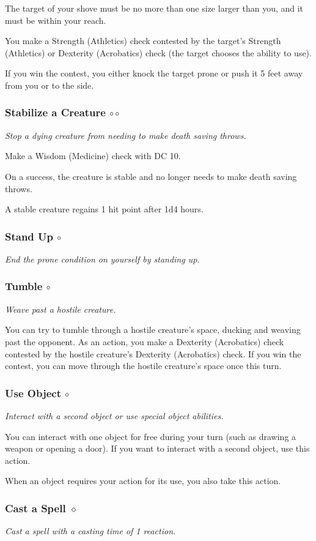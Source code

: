     The target of your shove must be no more than one size larger than you, and it must be within your reach.

    You make a Strength (Athletics) check contested by the target's Strength (Athletics) or Dexterity (Acrobatics) check (the target chooses the ability to use).

    If you win the contest, you either knock the target prone or push it 5 feet away from you or to the side.
\subsubsection{Stabilize a Creature $\circ\circ$}
    \textit{Stop a dying creature from needing to make death saving throws.}

    Make a Wisdom (Medicine) check with DC 10.

    On a success, the creature is stable and no longer needs to make death saving throws.

    A stable creature regains 1 hit point after 1d4 hours.
\subsubsection{Stand Up $\circ$}
    \textit{End the prone condition on yourself by standing up.}
\subsubsection{Tumble $\circ$}
    \textit{Weave past a hostile creature.}

    You can try to tumble through a hostile creature's space, ducking and weaving past the opponent.
    As an action, you make a Dexterity (Acrobatics) check contested by the hostile creature's Dexterity (Acrobatics) check.
    If you win the contest, you can move through the hostile creature's space once this turn.
\subsubsection{Use Object $\circ$}
    \textit{Interact with a second object or use special object abilities.}

    You can interact with one object for free during your turn (such as drawing a weapon or opening a door).
    If you want to interact with a second object, use this action.

    When an object requires your action for its use, you also take this action.
\subsubsection{Cast a Spell $\diamond$}
    \textit{Cast a spell with a casting time of 1 reaction.}

